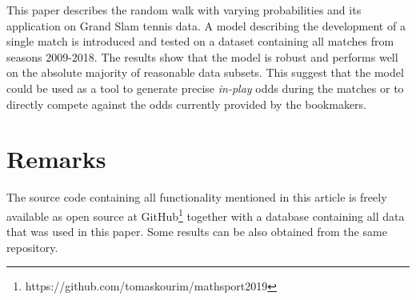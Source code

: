 \documentclass{easychair}
\begin{document}
This paper describes the random walk with varying probabilities and
its application on Grand Slam tennis data. A model describing the
development of a single match is introduced and tested on a dataset
containing all matches from seasons 2009-2018. The results show that
the model is robust and performs well on the absolute majority of
reasonable data subsets. This suggest that the model could be used
as a tool to generate precise \emph{in-play} odds during the matches
or to directly compete against the odds currently provided by the
bookmakers.

\section{Remarks}

The source code containing all functionality mentioned in this article
is freely available as open source at GitHub\footnote{https://github.com/tomaskourim/mathsport2019}
together with a database containing all data that was used in this
paper. Some results can be also obtained from the same repository.



\end{document}
